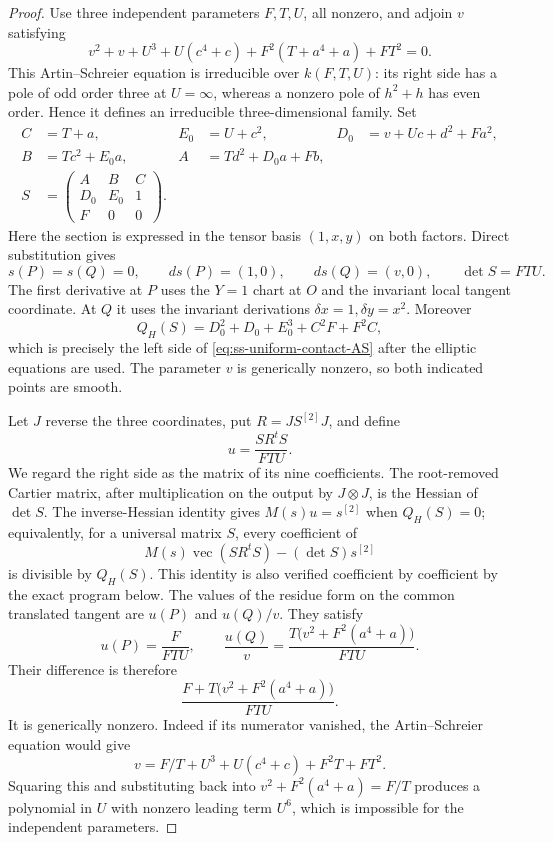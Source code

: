 \begin{proof}
Use three independent parameters $F,T,U$, all nonzero, and adjoin $v$
satisfying
\begin{equation}\label{eq:ss-uniform-contact-AS}
 v^2+v+U^3+U(c^4+c)+F^2(T+a^4+a)+FT^2=0.
\end{equation}
This Artin--Schreier equation is irreducible over $k(F,T,U)$:
its right side has a pole of odd order three at $U=\infty$,
whereas a nonzero pole of $h^2+h$ has even order. Hence it defines
an irreducible three-dimensional family. Set
\[
\begin{aligned}
 C&=T+a,& E_0&=U+c^2,& D_0&=v+Uc+d^2+Fa^2,\\
 B&=Tc^2+E_0a,& A&=Td^2+D_0a+Fb,\\
 S&=\begin{pmatrix}A&B&C\\D_0&E_0&1\\F&0&0\end{pmatrix}.
\end{aligned}
\]
Here the section is expressed in the tensor basis $(1,x,y)$ on
both factors. Direct substitution gives
\[
 s(P)=s(Q)=0,\qquad ds(P)=(1,0),\qquad ds(Q)=(v,0),
 \qquad\det S=FTU.
\]
The first derivative at $P$ uses the $Y=1$ chart at $O$ and the
invariant local tangent coordinate. At $Q$ it uses the invariant
derivations $\delta x=1,\delta y=x^2$.
Moreover
\[
 Q_H(S)=D_0^2+D_0+E_0^3+C^2F+F^2C,
\]
which is precisely the left side of
\eqref{eq:ss-uniform-contact-AS} after the elliptic equations
are used. The parameter $v$ is generically nonzero, so both indicated
points are smooth.

Let $J$ reverse the three coordinates, put $R=JS^{[2]}J$, and define
\[
                       u=\frac{S R^t S}{FTU}.
\]
We regard the right side as the matrix of its nine coefficients.
The root-removed Cartier matrix, after multiplication on the output
by $J\otimes J$, is the Hessian of $\det S$.
The inverse-Hessian identity gives
$M(s)u=s^{[2]}$ when $Q_H(S)=0$; equivalently, for a universal matrix
$S$, every coefficient of
\[
 M(s)\operatorname{vec}(S R^t S)
                   -(\det S)s^{[2]}
\]
is divisible by $Q_H(S)$. This identity is also verified coefficient
by coefficient by the exact program below.
The values of the residue form on the common translated tangent
are $u(P)$ and $u(Q)/v$. They satisfy
\[
 u(P)=\frac{F}{FTU},\qquad
 \frac{u(Q)}{v}=\frac{T\bigl(v^2+F^2(a^4+a)\bigr)}{FTU}.
\]
Their difference is therefore
\begin{equation}\label{eq:ss-uniform-contact-value}
       \frac{F+T\bigl(v^2+F^2(a^4+a)\bigr)}{FTU}.
\end{equation}
It is generically nonzero. Indeed if its numerator vanished, the
Artin--Schreier equation would give
\[
 v=F/T+U^3+U(c^4+c)+F^2T+FT^2.
\]
Squaring this and substituting back into
$v^2+F^2(a^4+a)=F/T$ produces a polynomial in $U$ with nonzero
leading term $U^6$, which is impossible for the independent parameters.


\end{proof}
